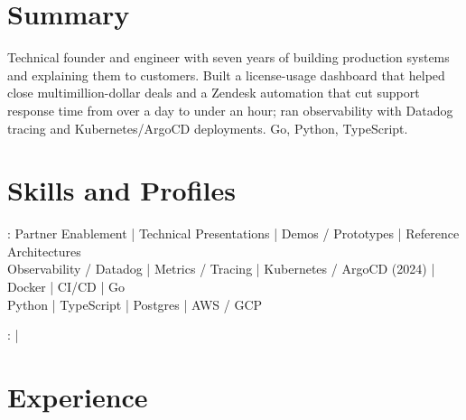 \documentclass[print]{jack-resume}
\begin{document}
\pagecolor{darkmodeBackground}


\begin{minipage}[t][1cm][t]{.03\textwidth}
    \hfill
\end{minipage}

\section{Summary}
Technical founder and engineer with seven years of building production systems and explaining them to customers. Built a license-usage dashboard that helped close multimillion-dollar deals and a Zendesk automation that cut support response time from over a day to under an hour; ran observability with Datadog tracing and Kubernetes/ArgoCD deployments. Go, Python, TypeScript.
\sectionsep

\section{Skills and Profiles}
:
Partner Enablement \hfill | \hfill
Technical Presentations \hfill | \hfill
Demos / Prototypes \hfill | \hfill
Reference Architectures \\
\hspace{1.0cm} Observability / Datadog \hfill | \hfill
Metrics / Tracing \hfill | \hfill
Kubernetes / ArgoCD (2024) \hfill | \hfill
Docker \hfill | \hfill
CI/CD \hfill | \hfill
Go \\
\hspace{1.0cm} Python \hfill | \hfill
TypeScript \hfill | \hfill
Postgres \hfill | \hfill
AWS / GCP \\

\raggedright{
    :
      \href{https://www.linkedin.com/in/jack-sturtevant/}{ \ExternalLink} |
     \href{https://github.com/jacksturt}{ \ExternalLink}}

\section{Experience}
\end{document}
